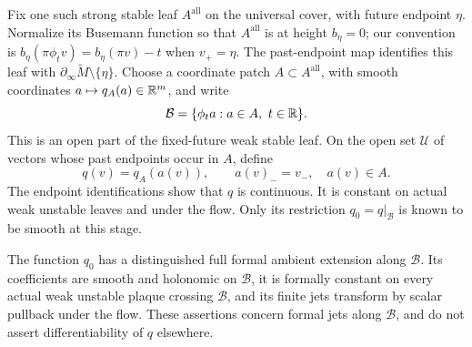 Fix one such strong stable leaf $A^{\mathrm{all}}$ on the universal cover,
with future endpoint $\eta$.  Normalize its Busemann function so that
$A^{\mathrm{all}}$ is at height $b_\eta=0$; our convention is
$b_\eta(\pi\phi_t v)=b_\eta(\pi v)-t$ when $v_+=\eta$.
The past-endpoint map identifies this leaf with
$\partial_\infty\widetilde M\setminus\{\eta\}$.  Choose a coordinate patch
$A\subset A^{\mathrm{all}}$, with smooth coordinates $a\mapsto q_A(a)\in
\mathbb R^m$, and write
\[
 \mathcal B=\{\phi_t a:a\in A,\ t\in\mathbb R\}.
\]
This is an open part of the fixed-future weak stable leaf.  On the open
set $\mathcal U$ of vectors whose past endpoints occur in $A$, define
\begin{equation}
 \label{smooth:label-definition}
 q(v)=q_A(a(v)),\qquad a(v)_-=v_-,\quad a(v)\in A.
\end{equation}
The endpoint identifications show that $q$ is continuous.  It is constant
on actual weak unstable leaves and under the flow.  Only its restriction
$q_0=q|_{\mathcal B}$ is known to be smooth at this stage.

\begin{lemma}
\label{smooth:formal-labels}
The function $q_0$ has a distinguished full formal ambient extension along
$\mathcal B$.  Its coefficients are smooth and holonomic on $\mathcal B$,
it is formally constant on every actual weak unstable plaque crossing
$\mathcal B$, and its finite jets transform by scalar pullback under the
flow.  These assertions concern formal jets along $\mathcal B$, and do
not assert differentiability of $q$ elsewhere.
\end{lemma}

